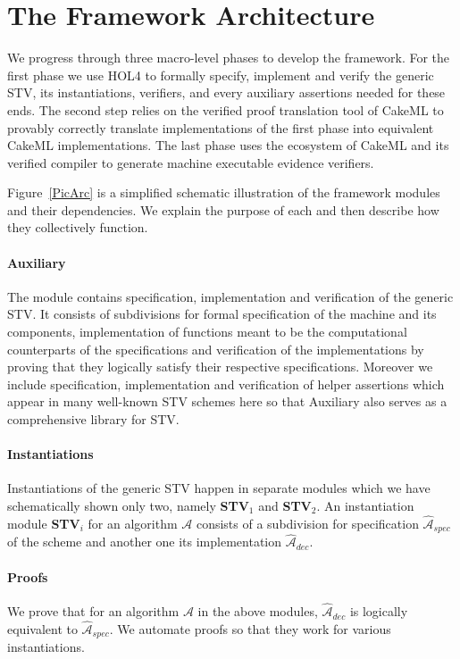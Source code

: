 \documentclass[10pt,conference]{IEEEtran}
\begin{document}
\section{The Framework Architecture}\label{sec:Arc} 
We progress through three macro-level phases to develop the framework. For the first phase we use HOL4 to formally specify, implement and verify the generic STV, its instantiations, verifiers, and every auxiliary assertions needed for these ends. The second step relies on the verified proof translation tool of CakeML to provably correctly translate implementations of the first phase into equivalent CakeML implementations. The last phase uses the ecosystem of CakeML and its verified compiler to generate machine executable evidence verifiers.   


Figure~\ref{PicArc} is a simplified schematic illustration of the framework modules and their dependencies. We explain the purpose of each and then describe how they collectively function.

\paragraph*{\textbf{Auxiliary}} The module contains specification, implementation and verification of the generic STV. It consists of subdivisions for formal specification of the machine and its components, implementation of functions  meant to be the computational counterparts of the specifications and verification of the implementations by proving that they logically satisfy their respective specifications. Moreover we include specification, implementation and verification of helper assertions which appear in many well-known STV schemes here so that Auxiliary also serves as a comprehensive library for STV. 
\paragraph*{\textbf{Instantiations}}
  Instantiations of the generic STV happen in separate modules which we have schematically shown only two, namely   \textbf{STV}$_{1}$ and \textbf{STV}$_{2}$. An instantiation module \textbf{STV}$_{i}$ for an algorithm $\mathcal{A}$ consists of a subdivision for specification $\hat{\mathcal{A}}_{spec}$ of  the scheme and another one its implementation $\hat{\mathcal{A}}_{dec}$. 
\paragraph*{\textbf{Proofs}} We prove that for an algorithm $\mathcal{A}$ in the above modules,  $\hat{\mathcal{A}}_{dec}$ is logically equivalent to $\hat{\mathcal{A}}_{spec}$. We automate proofs so that they work for various instantiations. 
\end{document}
